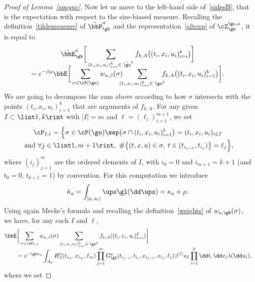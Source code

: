 \begin{proof}[Proof of Lemma~\ref{spayne}]
Now let us move to the left-hand side of~\eqref{sidesB}, that is the expectation with respect to the size-biased measure.
Recalling the definition~\eqref{tildemeasure} of $\tilde \bbP_{\gb}^{a}$
and the representation~\eqref{altexp} of $\cZ_{\gb}^{\go,a}$,
it is equal to\vspace*{-5pt}\enlargethispage{\baselineskip}%
\begin{multline}
\label{rhsofsides2}
\tilde \bbE_{\gb}^{a} \bigg[ \sum_{(t_i,x_i,u_i)_{i=i}^k\in \; \hat \go^k} f_{k,A} \bigl((t_i,x_i,u_i)_{i=i}^k \bigr) \bigg] \\[-8pt]
= e^{-\beta \mu}\bbE\bigg[ \sum_{\sigma \in \cP(\go) } w_{a,\beta}(\sigma) \!\!\!\!\sum_{(t_i,x_i,u_i)_{i=i}^k\in\; \go^k }\!\!\!\! f_{k,A}\bigl((t_i,x_i,u_i)_{i=1}^k\bigr) \bigg].
\end{multline}
We are going to decompose the sum above according to how $\sigma$ intersects with the points $(t_i,x_i,u_i)_{i=1}^k$ that are arguments of $f_{k,A}$.
For any given $I\subset \lint 1,k\rint$ with $|I| =m$ and $\ell= (\ell_i)_{i=1}^{m+1}$, we set\vspace*{-5pt}
\begin{multline*}
\cP_{I,\ell}=\Bigl\{ \sigma \in \cP(\go) \sep \bigl(\sigma \cap (t_i,x_i,u_i)_{i=1}^{k}\bigr)= (t_i,x_i,u_i)_{i\in I} \\[-3pt]
\text{ and }
\forall j\in \lint 1, m+1\rint, \ \#\bigl\{ (t,x,u) \in \sigma, \; t \in (t_{i_{j-1}},t_{i_{j}}) \bigr\} =\ell_j \Bigr\},
\end{multline*}
where $(i_j)_{j=1}^m$ are the ordered elements of $I$,
with $i_0=0$ and $i_{m+1}=k+1$ (and $t_0=0$, $t_{k+1} =1$) by convention.
For this computation we introduce\vspace*{-3pt}
\[
\bar \kappa_a= \int_{[a,\infty)} \ups \gl(\dd \ups) = \kappa_a+\mu.
\]
Using again Mecke's formula and recalling the definition~\eqref{weights} of $w_{a,\gb}(\sigma)$,
we have,
for any such $I$ and $\ell$,\vspace*{-2pt}
\begin{align*}
\bbE & \bigg[ \sum_{\sigma\in \cP_{I,\ell} } w_{a,\beta}(\sigma)\sum_{(t_i,x_i,u_i)_{i=i}^k\in\; \go^k} f_{k,A}((t_i,x_i,u_i)_{i=i}^k) \bigg] \\[-5pt]
& = e^{-\gb \kappa_a} \int_{A_k} H^{a}_{\beta}(t_{i_{m}},x_{i_m}, \ell_{m})
\prod_{j=1}^{m}
G^{a}_{\gb} (t_{i_{j-1}},t_{i_j},x_{i_{j-1}}, x_{i_j}, \ell_j) \beta^{|I|} u_I \prod_{i=1}^k \dd t_i\,\dd x_i \lambda(\dd u_i),
\end{align*}
where we set\vspace*{-5pt}

\end{proof}
